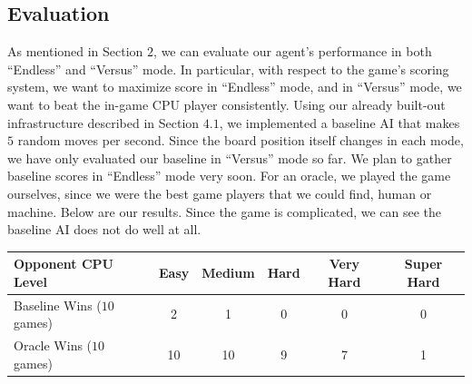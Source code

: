 \documentclass[10pt, final]{article}
\begin{document}
\subsection{Evaluation}
As mentioned in Section $2$, we can evaluate our agent's performance in both ``Endless'' and ``Versus'' mode. In particular, with respect to the game's scoring system, we want to maximize score in ``Endless'' mode, and in ``Versus'' mode, we want to beat the in-game CPU player consistently. Using our already built-out infrastructure described in Section $4.1$, we implemented a baseline AI that makes $5$ random moves per second. Since the board position itself changes in each mode, we have only evaluated our baseline in ``Versus'' mode so far. We plan to gather baseline scores in ``Endless'' mode very soon. For an oracle, we played the game ourselves, since we were the best game players that we could find, human or machine. Below are our results. Since the game is complicated, we can see the baseline AI does not do well at all.
\begin{center}\begin{tabular}{l||c|c|c|c|c}
Opponent CPU Level & Easy & Medium & Hard & Very Hard & Super Hard \\ \hline \hline
Baseline Wins ($10$ games) & 2 & 1 & 0 & 0 & 0 \\ \hline
Oracle Wins ($10$ games) & 10 & 10 & 9 & 7 & 1
\end{tabular}\end{center}
\newpage
\end{document}
